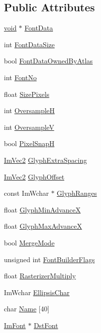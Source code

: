 \subsection*{Public Attributes}
\begin{DoxyCompactItemize}
\item 
\hyperlink{imgui__impl__opengl3__loader_8h_ac668e7cffd9e2e9cfee428b9b2f34fa7}{void} $\ast$ \hyperlink{structImFontConfig_a0265861de7ba7b0d953e1c97e7a50cf3}{Font\+Data}
\item 
int \hyperlink{structImFontConfig_a39df7ad3bb496421ce2cc5d2428345ef}{Font\+Data\+Size}
\item 
bool \hyperlink{structImFontConfig_a99dfbf61ef79cee89b6f03e17cbe63b4}{Font\+Data\+Owned\+By\+Atlas}
\item 
int \hyperlink{structImFontConfig_ab37ee3d5cf76000a4000e9296161e527}{Font\+No}
\item 
float \hyperlink{structImFontConfig_a2eff9cc7a11461414402f08ab910d277}{Size\+Pixels}
\item 
int \hyperlink{structImFontConfig_ab460df0d8019ffa8d124e8988c710910}{OversampleH}
\item 
int \hyperlink{structImFontConfig_a8018f84c60bfafb2b4629aeb77a047cb}{OversampleV}
\item 
bool \hyperlink{structImFontConfig_a635b5fa03934467891fa949a037b5b89}{Pixel\+SnapH}
\item 
\hyperlink{structImVec2}{Im\+Vec2} \hyperlink{structImFontConfig_a82db103689b1c434ec92875721967c07}{Glyph\+Extra\+Spacing}
\item 
\hyperlink{structImVec2}{Im\+Vec2} \hyperlink{structImFontConfig_a290a81956fdcb7ad3b5e3152594db121}{Glyph\+Offset}
\item 
const Im\+Wchar $\ast$ \hyperlink{structImFontConfig_aa174ceff80323012cd1b717d864258dd}{Glyph\+Ranges}
\item 
float \hyperlink{structImFontConfig_a3015c4ad464a7b5abeb5b926e8896bf6}{Glyph\+Min\+AdvanceX}
\item 
float \hyperlink{structImFontConfig_af9040efaa5998aef3add4b629d7dc255}{Glyph\+Max\+AdvanceX}
\item 
bool \hyperlink{structImFontConfig_ad5cab281622e5bdec8e2d55cadc5601e}{Merge\+Mode}
\item 
unsigned int \hyperlink{structImFontConfig_a2582eeaf361f50881a4f02fb1e96d085}{Font\+Builder\+Flags}
\item 
float \hyperlink{structImFontConfig_a9365265cc52098a8ecf89ff47f6106f2}{Rasterizer\+Multiply}
\item 
Im\+Wchar \hyperlink{structImFontConfig_af58c73936500737189bbcfa3480f8c3c}{Ellipsis\+Char}
\item 
char \hyperlink{structImFontConfig_a12d3c014914d3b77533e219a013dc750}{Name} \mbox{[}40\mbox{]}
\item 
\hyperlink{structImFont}{Im\+Font} $\ast$ \hyperlink{structImFontConfig_a561773c311f6cf6de00642c2801e7b92}{Dst\+Font}
\end{DoxyCompactItemize}


